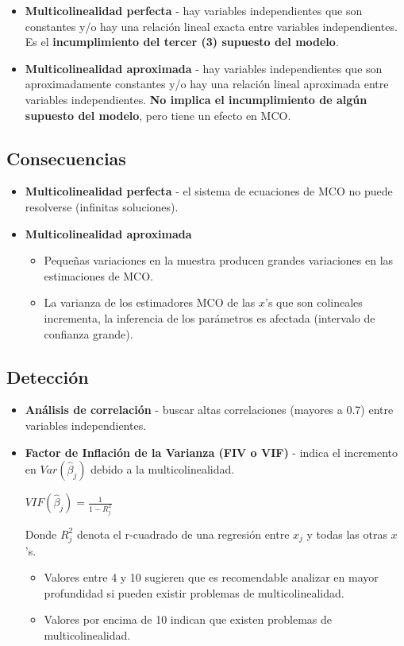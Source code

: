 \documentclass[10pt, a4paper, landscape]{extarticle}
\begin{document}
\begin{multicols}{3}
\begin{itemize}[leftmargin=*]
\item \textbf{Multicolinealidad perfecta} - hay variables independientes que son constantes y/o hay una relación lineal exacta entre variables independientes. Es el \textbf{incumplimiento del tercer (3) supuesto del modelo}.
\item \textbf{Multicolinealidad aproximada} - hay variables independientes que son aproximadamente constantes y/o hay una relación lineal aproximada entre variables independientes. \textbf{No implica el incumplimiento de algún supuesto del modelo}, pero tiene un efecto en MCO.
\end{itemize}

\subsection*{Consecuencias}

\begin{itemize}[leftmargin=*]
\item \textbf{Multicolinealidad perfecta} - el sistema de ecuaciones de MCO no puede resolverse (infinitas soluciones).
\item \textbf{Multicolinealidad aproximada}
\begin{itemize}[leftmargin=*]
\item Pequeñas variaciones en la muestra producen grandes variaciones en las estimaciones de MCO.
\item La varianza de los estimadores MCO de las $x$'s que son colineales incrementa, la inferencia de los parámetros es afectada (intervalo de confianza grande).
\end{itemize}
\end{itemize}

\subsection*{Detección}

\begin{itemize}[leftmargin=*]
\item \textbf{Análisis de correlación} - buscar altas correlaciones (mayores a 0.7) entre variables independientes.
\item \textbf{Factor de Inflación de la Varianza (FIV o VIF)} - indica el incremento en $Var(\hat{\beta}_j)$ debido a la multicolinealidad.
\begin{center}
$VIF(\hat{\beta}_j) = \frac{1}{1-R_j^2}$
\end{center}
Donde $R^2_j$ denota el r-cuadrado de una regresión entre $x_j$ y todas las otras $x$'s. 
\begin{itemize}[leftmargin=*]
\item Valores entre 4 y 10 sugieren que es recomendable analizar en mayor profundidad si pueden existir problemas de multicolinealidad.
\item Valores por encima de 10 indican que existen problemas de multicolinealidad.
\end{itemize}
\end{itemize}


\end{multicols}
\end{document}
